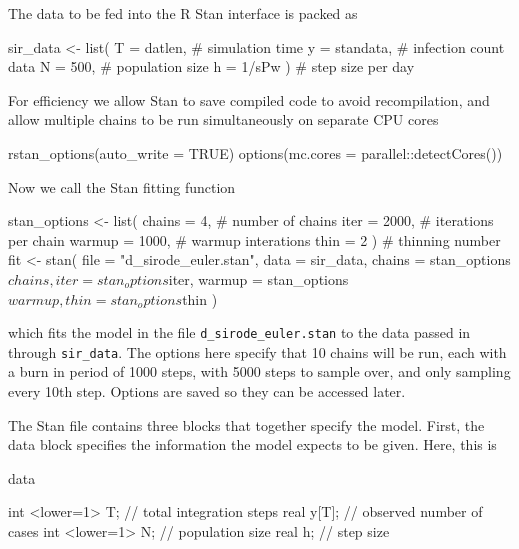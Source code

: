     The data to be fed into the R Stan interface is packed as

    \begin{R}
    sir_data <- list( T = datlen,    # simulation time
                     y = standata,  # infection count data
                     N = 500,       # population size
                     h = 1/sPw )    # step size per day 
    \end{R}

    For efficiency we allow Stan to save compiled code to avoid recompilation, and allow multiple chains to be run simultaneously on separate CPU cores

    \begin{R}
    rstan_options(auto_write = TRUE)
    options(mc.cores = parallel::detectCores())
    \end{R}

    Now we call the Stan fitting function

    \begin{R}
	stan_options <- list(	  chains = 4,    # number of chains
                        	iter   = 2000, # iterations per chain
                        	warmup = 1000, # warmup interations
                        	thin   = 2 )   # thinning number
	fit <- stan( file    = "d_sirode_euler.stan",
            	data    = sir_data,
            	chains  = stan_options$chains,
            	iter    = stan_options$iter,
            	warmup  = stan_options$warmup,
            	thin    = stan_options$thin )
    \end{R}

    which fits the model in the file \verb|d_sirode_euler.stan| to the data passed in through \verb|sir_data|. The options here specify that 10 chains will be run, each with a burn in period of 1000 steps, with 5000 steps to sample over, and only sampling every 10th step. Options are saved so they can be accessed later.

    The Stan file contains three blocks that together specify the model. First, the data block specifies the information the model expects to be given. Here, this is

    \begin{Stan}
    data {

        int     <lower=1>   T;      // total integration steps
        real                y[T];   // observed number of cases
        int     <lower=1>   N;      // population size
        real                h;      // step size

    }
    \end{Stan}

